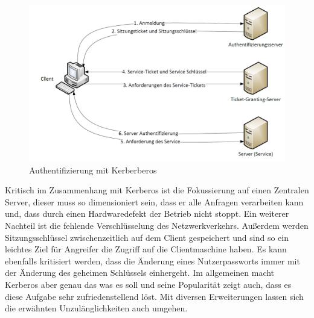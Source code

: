 \documentclass[
book,
a4paper,   
titlepage,  
halfparskip,
12pt        
]{scrartcl}
\begin{document}
\begin{onehalfspacing}
\begin{figure}[h]
	\centering
	\includegraphics[width=1\linewidth]{kerberos.png}
	\caption[Kerberos]{Authentifizierung mit Kerberberos \cite[vgl. S.140]{kerberos2}}
	\label{fig:kerb}
\end{figure}
Kritisch im Zusammenhang mit Kerberos ist die Fokussierung auf einen Zentralen Server, dieser muss so dimensioniert sein, dass er alle Anfragen verarbeiten kann und, dass durch einen Hardwaredefekt der Betrieb nicht stoppt. Ein weiterer Nachteil ist die fehlende Verschlüsselung des Netzwerkverkehrs. Außerdem werden Sitzungsschlüssel zwischenzeitlich auf dem Client gespeichert und sind so ein leichtes Ziel für Angreifer die Zugriff auf die Clientmaschine haben. Es kann ebenfalls kritisiert werden, dass die Änderung eines Nutzerpassworts immer mit der Änderung des geheimen Schlüssels einhergeht. Im allgemeinen macht Kerberos aber genau das was es soll und seine Popularität zeigt auch, dass es diese Aufgabe sehr zufriedenstellend löst. Mit diversen Erweiterungen lassen sich die erwähnten Unzulänglichkeiten auch umgehen.\cite[vgl. S.138f]{kerberos2}


\end{onehalfspacing}
\end{document}
